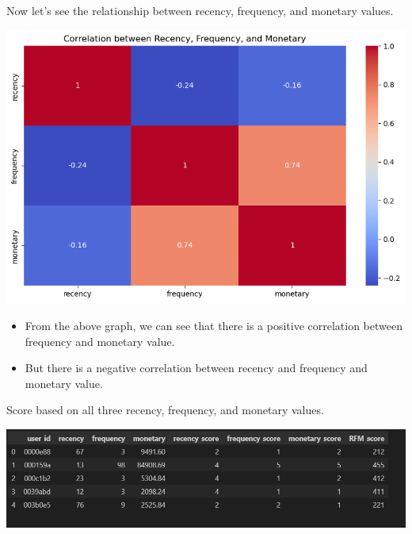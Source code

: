 \documentclass{article}
\begin{document}
Now let's see the relationship between recency, frequency, and monetary values.{
    \begin{center}
        \includegraphics[width=1\columnwidth]{images/rfm.png}
    \end{center}
    \begin{tcolorbox}[colback=backgroundColor, colframe=accentColor2, title=Insights, fonttitle=\bfseries]
        \begin{itemize}
           \item From the above graph, we can see that there is a positive correlation between frequency and monetary value.\\
           \item But there is a negative correlation between recency and frequency and monetary value.\\
        \end{itemize}
       \end{tcolorbox}
}

\large
Score based on all three recency, frequency, and monetary values.\\
\begin{center}
    \includegraphics[width=1\columnwidth]{images/rfm-score.png}
\end{center}
\end{document}
